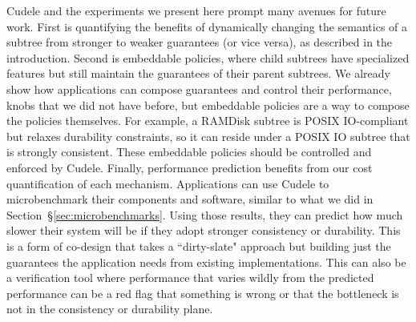 Cudele and the experiments we present here prompt many avenues for future work.
First is quantifying the benefits of dynamically changing the semantics of a
subtree from stronger to weaker guarantees (or vice versa), as described in the
introduction. Second is embeddable policies, where child subtrees have
specialized features but still maintain the guarantees  of their parent
subtrees. We already show how applications can compose guarantees and control
their performance, knobs that we did not have before, but embeddable policies
are a way to compose the policies themselves.  For example, a RAMDisk subtree
is POSIX IO-compliant but relaxes durability constraints, so it can reside
under a POSIX IO subtree that is strongly consistent. These embeddable policies
should be controlled and enforced by Cudele.  Finally, performance prediction
benefits from our cost quantification of each mechanism. Applications can use
Cudele to microbenchmark their components and software, similar to what we did
in Section~\S\ref{sec:microbenchmarks}. Using those results, they can predict
how much slower their system will be if they adopt stronger consistency or
durability.  This is a form of co-design that takes a ``dirty-slate" approach
but building just the guarantees the application needs from existing
implementations.  This can also be a verification tool where performance that
varies wildly from the predicted performance can be a red flag that something
is wrong or that the bottleneck is not in the consistency or durability plane.

%

